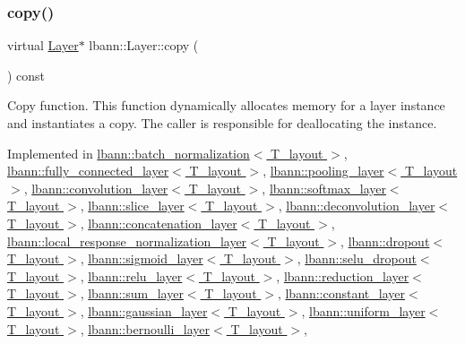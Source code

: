 \subsubsection{\texorpdfstring{copy()}{copy()}}
{\footnotesize\ttfamily virtual \hyperlink{classlbann_1_1Layer}{Layer}$\ast$ lbann\+::\+Layer\+::copy (\begin{DoxyParamCaption}{ }\end{DoxyParamCaption}) const\hspace{0.3cm}{\ttfamily [pure virtual]}}

Copy function. This function dynamically allocates memory for a layer instance and instantiates a copy. The caller is responsible for deallocating the instance. 

Implemented in \hyperlink{classlbann_1_1batch__normalization_af149d82996f351a5897a16a78ced113d}{lbann\+::batch\+\_\+normalization$<$ T\+\_\+layout $>$}, \hyperlink{classlbann_1_1fully__connected__layer_a7e838b85cb7bf075def5a88fba2ace20}{lbann\+::fully\+\_\+connected\+\_\+layer$<$ T\+\_\+layout $>$}, \hyperlink{classlbann_1_1pooling__layer_a58f9e6223649bb79ad10a2411602d71d}{lbann\+::pooling\+\_\+layer$<$ T\+\_\+layout $>$}, \hyperlink{classlbann_1_1convolution__layer_ac2d126a93bc690a959daed54658aabd5}{lbann\+::convolution\+\_\+layer$<$ T\+\_\+layout $>$}, \hyperlink{classlbann_1_1softmax__layer_adbde9ddc7c6cec83645d4bebf8b54113}{lbann\+::softmax\+\_\+layer$<$ T\+\_\+layout $>$}, \hyperlink{classlbann_1_1slice__layer_a8c2b93a3ed24b239cc429ee85ee7ef29}{lbann\+::slice\+\_\+layer$<$ T\+\_\+layout $>$}, \hyperlink{classlbann_1_1deconvolution__layer_aac6d10cbe30d5fcfed0a584321012b3a}{lbann\+::deconvolution\+\_\+layer$<$ T\+\_\+layout $>$}, \hyperlink{classlbann_1_1concatenation__layer_a8cdb0b6f5dee578477a3125f5da74573}{lbann\+::concatenation\+\_\+layer$<$ T\+\_\+layout $>$}, \hyperlink{classlbann_1_1local__response__normalization__layer_a2bccec49f9b3840a2d9170cb202c1397}{lbann\+::local\+\_\+response\+\_\+normalization\+\_\+layer$<$ T\+\_\+layout $>$}, \hyperlink{classlbann_1_1dropout_a0e6e50b50f8c2620315f3257bbab41b3}{lbann\+::dropout$<$ T\+\_\+layout $>$}, \hyperlink{classlbann_1_1sigmoid__layer_a9ebc522a655f638eae27e51e759ad72f}{lbann\+::sigmoid\+\_\+layer$<$ T\+\_\+layout $>$}, \hyperlink{classlbann_1_1selu__dropout_a58659790298874e1dc15a45b3199db91}{lbann\+::selu\+\_\+dropout$<$ T\+\_\+layout $>$}, \hyperlink{classlbann_1_1relu__layer_af17be85b90887cf3d413fd21e7e20b5c}{lbann\+::relu\+\_\+layer$<$ T\+\_\+layout $>$}, \hyperlink{classlbann_1_1reduction__layer_a5a47c9c732716928131445230ef97af6}{lbann\+::reduction\+\_\+layer$<$ T\+\_\+layout $>$}, \hyperlink{classlbann_1_1sum__layer_a8b6581df51a10b1511c1df6322f445a4}{lbann\+::sum\+\_\+layer$<$ T\+\_\+layout $>$}, \hyperlink{classlbann_1_1constant__layer_adf44af96fef92b565a933b04fecd0fa2}{lbann\+::constant\+\_\+layer$<$ T\+\_\+layout $>$}, \hyperlink{classlbann_1_1gaussian__layer_af8522e7d3c3da9a123180b49d9110367}{lbann\+::gaussian\+\_\+layer$<$ T\+\_\+layout $>$}, \hyperlink{classlbann_1_1uniform__layer_a3d148d514eaf8524a8ad3ec13ab69d59}{lbann\+::uniform\+\_\+layer$<$ T\+\_\+layout $>$}, \hyperlink{classlbann_1_1bernoulli__layer_acf1c58e256f8f5c494a15be4537cdb37}{lbann\+::bernoulli\+\_\+layer$<$ T\+\_\+layout $>$}, 